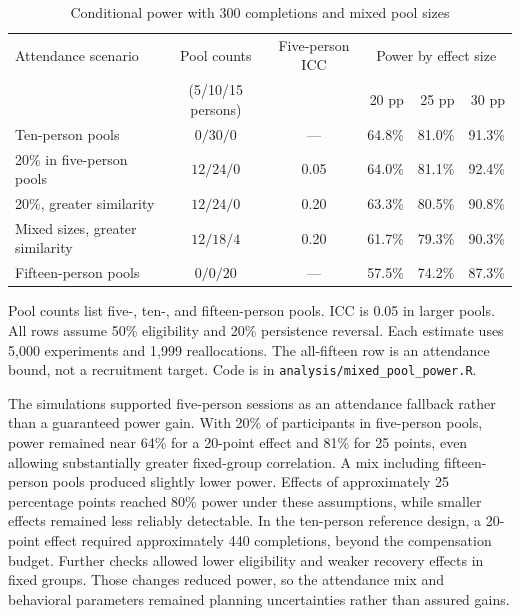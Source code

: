 \documentclass[11pt]{article}
\begin{document}
\begin{table}[H]
\centering
\small
\caption{Conditional power with 300 completions and mixed pool sizes}
\label{tab:power-sensitivity}
\begin{threeparttable}
\begin{tabular}{lccrrr}
\toprule
Attendance scenario & Pool counts & Five-person ICC & \multicolumn{3}{c}{Power by effect size} \\
& (5/10/15 persons) & & 20 pp & 25 pp & 30 pp \\
\midrule
Ten-person pools & $0/30/0$ & --- & 64.8\% & 81.0\% & 91.3\% \\
20\% in five-person pools & $12/24/0$ & 0.05 & 64.0\% & 81.1\% & 92.4\% \\
20\%, greater similarity & $12/24/0$ & 0.20 & 63.3\% & 80.5\% & 90.8\% \\
Mixed sizes, greater similarity & $12/18/4$ & 0.20 & 61.7\% & 79.3\% & 90.3\% \\
Fifteen-person pools & $0/0/20$ & --- & 57.5\% & 74.2\% & 87.3\% \\
\bottomrule
\end{tabular}
\begin{tablenotes}[flushleft]\footnotesize
\item Pool counts list five-, ten-, and fifteen-person pools. ICC is 0.05 in larger pools. All rows assume 50\% eligibility and 20\% persistence reversal. Each estimate uses 5,000 experiments and 1,999 reallocations. The all-fifteen row is an attendance bound, not a recruitment target. Code is in \texttt{analysis/mixed\_pool\_power.R}.
\end{tablenotes}
\end{threeparttable}
\end{table}

The simulations supported five-person sessions as an attendance fallback rather than a guaranteed power gain. With 20\% of participants in five-person pools, power remained near 64\% for a 20-point effect and 81\% for 25 points, even allowing substantially greater fixed-group correlation. A mix including fifteen-person pools produced slightly lower power. Effects of approximately 25 percentage points reached 80\% power under these assumptions, while smaller effects remained less reliably detectable. In the ten-person reference design, a 20-point effect required approximately 440 completions, beyond the compensation budget. Further checks allowed lower eligibility and weaker recovery effects in fixed groups. Those changes reduced power, so the attendance mix and behavioral parameters remained planning uncertainties rather than assured gains.
\end{document}
